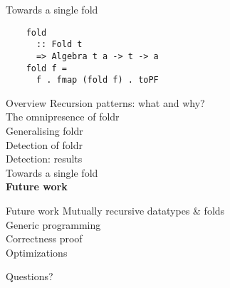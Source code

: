 \documentclass[20pt]{beamer}
\begin{document}
\begin{frame}[fragile]{Towards a single fold}
    \begin{lstlisting}
    fold
      :: Fold t
      => Algebra t a -> t -> a
    fold f =
      f . fmap (fold f) . toPF
    \end{lstlisting}
\end{frame}


\begin{frame}{Overview}
    Recursion patterns: what and why? \\
    The omnipresence of foldr \\
    Generalising foldr \\
    Detection of foldr \\
    Detection: results \\
    Towards a single fold \\
    \textbf{Future work} \\
\end{frame}

\begin{frame}{Future work}
    Mutually recursive datatypes \& folds \\
    Generic programming \\
    Correctness proof \\
    Optimizations \\
\end{frame}


\begin{frame}{}
    \begin{center}
    \center\huge{Questions?}
    \end{center}
\end{frame}
\end{document}
